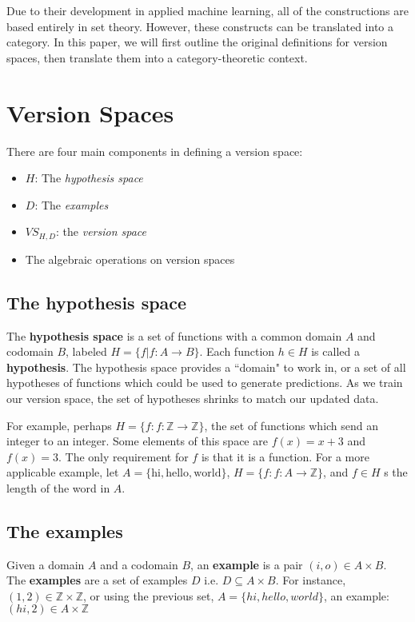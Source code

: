 \documentclass{article}
\theoremstyle{definition}
\begin{document}
Due to their development in applied machine learning, all of the constructions are based entirely in set theory. However, these constructs can be translated into a category. In this paper, we will first outline the original definitions for version spaces, then translate them into a category-theoretic context. 

\section{Version Spaces}
There are four main components in defining a version space: 
\begin{itemize}
    \item $H$: The \textit{hypothesis space}
    \item $D$: The \textit{examples}
    \item $VS_{H,D}$: the \textit{version space}
    \item The algebraic operations on version spaces
\end{itemize}


\subsection{The hypothesis space}

The \textbf{hypothesis space} is a set of functions with a common domain $A$ and codomain $B$, labeled $H = \{f | f: A \rightarrow B \}$. Each function $h \in H$ is called a \textbf{hypothesis}.  The hypothesis space provides a ``domain" to work in, or a set of all hypotheses of functions which could be used to generate predictions. As we train our version space, the set of hypotheses shrinks to match our updated data. 

For example, perhaps $H = \{f: f: \mathbb{Z} \rightarrow \mathbb{Z}\}$, the set of functions which send an integer to an integer. Some elements of this space are $f(x) = x + 3$ and $f(x) = 3$. The only requirement for $f$ is that it is a function. For a more applicable example, let $A = \{\text{hi}, \text{hello}, \text{world}\}$, $H = \{f: f: A\rightarrow \mathbb{Z}\}$, and $f\in H$ s the length of the word in $A$. 

\subsection{The examples}
Given a domain $A$ and a codomain $B$, an \textbf{example} is a pair $(i, o)\in A \times B$. The \textbf{examples} are a set of examples $D$ i.e. $D \subseteq A \times B$. For instance, $(1,2) \in \mathbb{Z} \times \mathbb{Z}$, or using the previous set, $A = \{hi, hello, world\}$, an example: $(hi, 2) \in A \times \mathbb{Z}$
\end{document}

